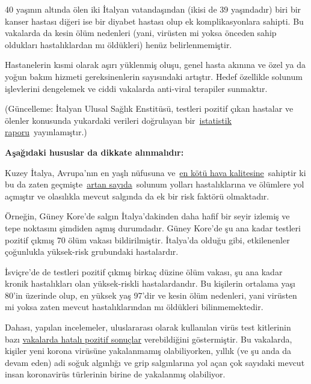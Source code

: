 40 yaşının altında ölen iki İtalyan vatandaşından (ikisi de 39
yaşındadır) biri bir kanser hastası diğeri ise bir diyabet hastası olup
ek komplikasyonlara sahipti. Bu vakalarda da kesin ölüm nedenleri (yani,
virüsten mi yoksa önceden sahip oldukları hastalıklardan mı öldükleri)
henüz belirlenmemiştir.

Hastanelerin kısmi olarak aşırı yüklenmiş oluşu, genel hasta akınına ve
özel ya da yoğun bakım hizmeti gereksinenlerin sayısındaki artıştır.
Hedef özellikle solunum işlevlerini dengelemek ve ciddi vakalarda
anti-viral terapiler sunmaktır.

(Güncelleme: İtalyan Ulusal Sağlık Enstitüsü, testleri pozitif çıkan
hastalar ve ölenler konusunda yukardaki verileri doğrulayan
bir~\href{https://www.epicentro.iss.it/coronavirus/bollettino/Report-COVID-2019_17_marzo-v2.pdf}{istatistik
raporu}~yayınlamıştır.)

\textbf{Aşağıdaki hususlar da dikkate alınmalıdır:}

Kuzey İtalya, Avrupa'nın en yaşlı nüfusuna
ve~\href{https://twitter.com/esa/status/1238480433047916545}{en kötü
hava kalitesine}~sahiptir ki bu da zaten
geçmişte~\href{https://www.thelocal.it/20170131/our-lungs-are-breaking-smog-levels-way-above-safe-limits-in-northern-italy}{artan
sayıda}~solunum yolları hastalıklarına ve ölümlere yol açmıştır ve
olasılıkla mevcut salgında da ek bir risk faktörü olmaktadır.

Örneğin, Güney Kore'de salgın İtalya'dakinden daha hafif bir seyir
izlemiş ve tepe noktasını şimdiden aşmış durumdadır. Güney Kore'de şu
ana kadar testleri pozitif çıkmış 70 ölüm vakası bildirilmiştir.
İtalya'da olduğu gibi, etkilenenler çoğunlukla yüksek-risk grubundaki
hastalardır.

İsviçre'de de testleri pozitif çıkmış birkaç düzine ölüm vakası, şu ana
kadar kronik hastalıkları olan yüksek-riskli hastalardandır. Bu
kişilerin ortalama yaşı 80'in üzerinde olup, en yüksek yaş 97'dir ve
kesin ölüm nedenleri, yani virüsten mi yoksa zaten mevcut
hastalıklarından mı öldükleri bilinmemektedir.

Dahası, yapılan incelemeler, uluslararası olarak kullanılan virüs test
kitlerinin bazı
\href{https://www.ncbi.nlm.nih.gov/pmc/articles/PMC2095096/}{vakalarda
hatalı pozitif sonuçlar} verebildiğini göstermiştir. Bu vakalarda,
kişiler yeni korona virüsüne yakalanmamış olabiliyorken, yıllık (ve şu
anda da devam eden) adi soğuk algınlığı ve grip salgınlarına yol açan
çok sayıdaki mevcut insan koronavirüs türlerinin birine de yakalanmış
olabiliyor.\\

